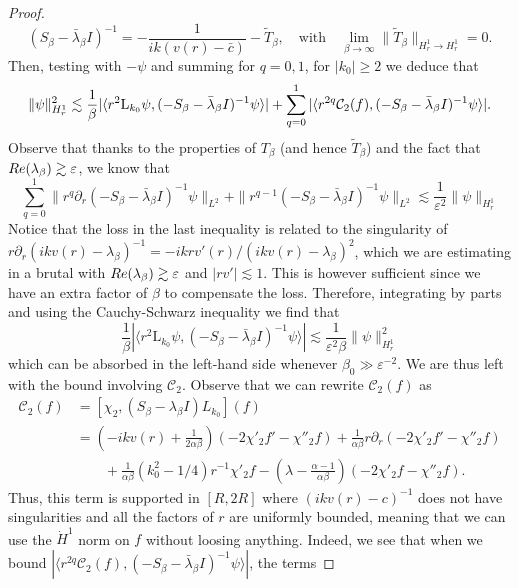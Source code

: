 \documentclass[10pt,a4paper]{amsart}
\def\Re{{\rm Re}}
\def\de{{\partial}}
\def\eps{\varepsilon}
\newcommand{\rmL}{\mathrm{L}}
\begin{document}
\begin{proof}
\begin{equation}
    (S_\beta-\bar{\lambda}_\beta I)^{-1}=-\frac{1}{ik(v(r)-\bar c)}-\tilde T_\beta, \quad \text{with}\quad 
\lim_{\beta \rightarrow \infty} \|\tilde T_{\beta} \|_{H^1_r \to H^1_r} = 0.
\end{equation}
Then, testing with $-\psi$ and summing for $q=0,1$,  for $|k_0|\geq 2$ we deduce that
\begin{align}
\notag
\|\psi\|^2_{H^1_r}
   \lesssim  \frac{1}{\beta}|\langle r^{2}\rmL_{k_0}\psi, (-S_\beta-\bar{\lambda}_\beta I)^{-1} \psi \rangle | 
+\sum_{q=0}^1|\langle r^{2q}\mathcal{C}_2(f), (-S_\beta-\bar{\lambda}_\beta I)^{-1} \psi \rangle|.
\end{align}
Observe that thanks to the properties of $T_\beta$ (and hence $\tilde{T}_\beta$) and the fact that $\Re(\lambda_\beta)\gtrsim \eps$, we know that 
\begin{equation}
   \sum_{q=0}^1 \|r^q\de_r(-S_\beta-\bar{\lambda}_\beta I)^{-1} \psi\|_{L^2}+\|r^{q-1}(-S_\beta-\bar{\lambda}_\beta I)^{-1} \psi\|_{L^2}\lesssim \frac{1}{\eps^2}\|\psi\|_{H^1_r}
\end{equation}
Notice that the loss in the last inequality is related to the singularity of $r\de_r(ikv(r)-\lambda_\beta)^{-1}=-ikrv'(r)/(ikv(r)-\lambda_\beta)^2$, which we are estimating in a brutal with $\Re(\lambda_\beta)\gtrsim \eps$ and $|rv'|\lesssim 1$. This is however sufficient since we have an extra factor of $\beta$ to compensate the loss. 
Therefore,  integrating by parts  and using the Cauchy-Schwarz inequality we find that 
\begin{equation}
   \frac{1}{\beta} |\langle r^{2}\rmL_{k_0}\psi, (-S_\beta-\bar{\lambda}_\beta I)^{-1} \psi \rangle |\lesssim \frac{1}{\eps^2\beta}\|\psi\|_{H^1_r}^2
\end{equation}
which can be absorbed in the left-hand side whenever $\beta_0\gg \eps^{-2}$. We are thus left with the bound involving $\mathcal{C}_2$. Observe that we can rewrite $\mathcal C_2(f)$ as
\begin{align}
\label{eq:c2rewritten}
\mathcal{C}_2(f) & =  [\chi_2, (S_\beta - \lambda_\beta I)L_{k_0}](f) \\ & = \left(-ikv(r) + \frac{1}{2\alpha \beta}\right) (-2\chi'_2 f' - \chi''_2 f) + \frac{1}{\alpha \beta} r\de_r (-2\chi'_2 f' - \chi''_2 f) \\ & \qquad + \frac{1}{\alpha \beta} (k_0^2 -1/4) r^{-1} \chi'_2 f - \left(\lambda - \frac{\alpha -1}{\alpha\beta}\right) (-2\chi'_2 f - \chi''_2 f).
\end{align}
Thus, this term is supported in $[R,2R]$ where $(ikv(r)-c)^{-1}$ does not have singularities and all the factors of $r$ are uniformly bounded, meaning that we can use the $\dot{H}^1$ norm on $f$ without loosing anything. Indeed, we see that when we bound $|\langle r^{2q}\mathcal{C}_2(f), (-S_\beta-\bar\lambda_\beta I)^{-1} \psi \rangle|$, the terms 

\end{proof}
\end{document}
